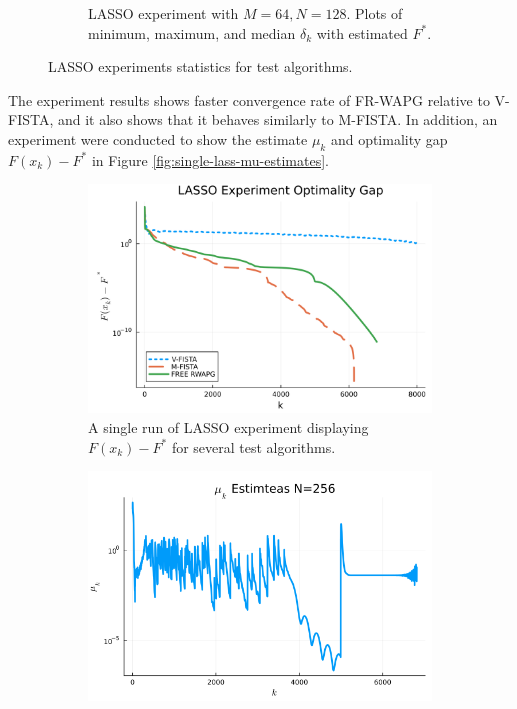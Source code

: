 \documentclass[12pt]{article}
\begin{document}
\begin{figure}[H]
\begin{subfigure}[b]{0.47\textwidth}
                    \caption{LASSO experiment with $M = 64, N = 128$. Plots of minimum, maximum, and median $\delta_k$ with estimated $F^*$. }
                \end{subfigure}
                \caption{LASSO experiments statistics for test algorithms. }
                \label{fig:batched-lasso}
            \end{figure}
            The experiment results shows faster convergence rate of FR-WAPG relative to V-FISTA, and it also shows that it behaves similarly to M-FISTA.
            In addition, an experiment were conducted to show the estimate $\mu_k$ and optimality gap $F(x_k) - F^*$ in Figure \ref{fig:single-lass-mu-estimates}.
            \begin{figure}[H]
                \begin{subfigure}[b]{0.47\textwidth}
                    \includegraphics[width=\textwidth]{assets/lasso_loss_256.png}
                    \caption
                    {A single run of LASSO experiment displaying $F(x_k) - F^*$ for several test algorithms.
                    }
                \end{subfigure}
                \hfill
                \begin{subfigure}[b]{0.47\textwidth}
                    \includegraphics[width=\textwidth]{assets/lasso_sc_estimates_256.png}

\end{subfigure}
\end{figure}
\end{document}

